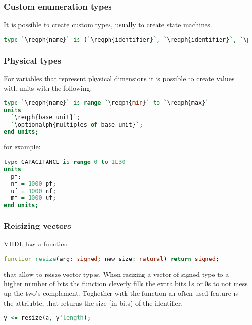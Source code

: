\subsubsection{Custom enumeration types}
It is possible to create custom types, usually to create state machines.
\begin{lstlisting}[language=vhdl]
type `\reqph{name}` is (`\reqph{identifier}`, `\reqph{identifier}`, `\ph{\ldots}`);
\end{lstlisting}

\subsubsection{Physical types}
For variables that represent physical dimensions it is possible to create
values with units with the following:
\begin{lstlisting}[language=vhdl]
type `\reqph{name}` is range `\reqph{min}` to `\reqph{max}`
units
  `\reqph{base unit}`;
  `\optionalph{multiples of base unit}`;
end units;
\end{lstlisting}
for example:
\begin{lstlisting}[language=vhdl]
type CAPACITANCE is range 0 to 1E30
units
  pf;
  nf = 1000 pf;
  uf = 1000 nf;
  mf = 1000 uf;
end units;
\end{lstlisting}

\subsubsection{Reisizing vectors}
VHDL has a function
\begin{lstlisting}[language=vhdl]
function resize(arg: signed; new_size: natural) return signed;
\end{lstlisting}
that allow to reisze vector types. When resizing a vector of signed type to a
higher number of bits the  function cleverly fills the extra bits
1s or 0s to not mess up the two's complement. Toghether with the 
function an often used feature is the  attriubte, that returns
the size (in bits) of the identifier.
\begin{lstlisting}[language=vhdl]
y <= resize(a, y'length);
\end{lstlisting}

